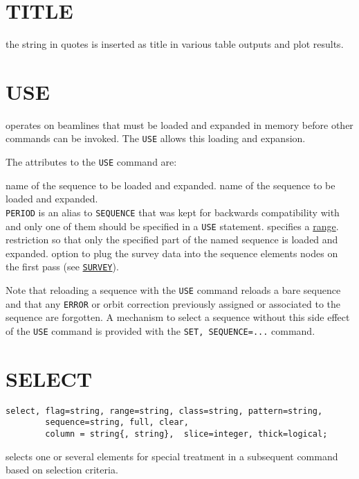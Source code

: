 \section{TITLE}
\label{sec:title}
the string in quotes is inserted as title in various table outputs and
plot results.  


\section{USE}
\label{sec:use}
\madx operates on beamlines that must be loaded and expanded in memory
before other commands can be invoked. The {\tt USE} allows this
loading and expansion.


The attributes to the {\tt USE} command are:
\begin{madlist}
   name of the sequence to be loaded and expanded. 
   name of the sequence to be loaded and expanded. \\ 
  {\tt PERIOD} is an alias to {\tt SEQUENCE} that was kept for
  backwards compatibility with \madeight and only one of them should be
  specified in a {\tt USE} statement. 
   specifies a \hyperref[sec:range]{range}.   
  restriction so that only the specified part of the named sequence is
  loaded and  expanded.
   option to plug the survey data into the sequence elements
  nodes on the first pass (see \hyperref[chap:survey]{\tt SURVEY}).
\end{madlist}

Note that reloading a sequence with the {\tt USE} command reloads a
bare sequence and that any {\tt ERROR} or orbit correction previously
assigned or associated to the sequence are forgotten. 
A mechanism to select a sequence without this side effect of the
{\tt USE} command is provided with the {\tt SET, SEQUENCE=...} command.


\section{SELECT} 
\label{sec:select}

\begin{verbatim}
select, flag=string, range=string, class=string, pattern=string,
        sequence=string, full, clear,
        column = string{, string},  slice=integer, thick=logical;
\end{verbatim} 
selects one or several elements for special treatment in a subsequent
command based on selection criteria.

